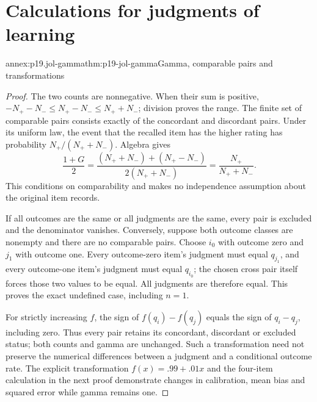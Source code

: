 \chapter{Calculations for judgments of learning}
\label{annex:p19-judgments-of-learning}

\begin{annexitem}{annex:p19.jol-gamma}{thm:p19-jol-gamma}{Gamma, comparable pairs and transformations}
\begin{proof}
The two counts are nonnegative. When their sum is positive,
\(-N_+-N_-\leq N_+-N_-\leq N_++N_-\); division proves
the range. The finite set of comparable pairs consists exactly
of the concordant and discordant pairs. Under its uniform law,
the event that the recalled item has the higher rating has
probability \(N_+/(N_++N_-)\). Algebra gives
\[
\frac{1+G}{2}
=\frac{(N_++N_-)+(N_+-N_-)}{2(N_++N_-)}
=\frac{N_+}{N_++N_-}.
\]
This conditions on comparability and makes no independence
assumption about the original item records.

If all outcomes are the same or all judgments are the same,
every pair is excluded and the denominator vanishes.
Conversely, suppose both outcome classes are nonempty and
there are no comparable pairs. Choose \(i_0\) with outcome
zero and \(j_1\) with outcome one. Every outcome-zero item's
judgment must equal \(q_{j_1}\), and every outcome-one item's
judgment must equal \(q_{i_0}\); the chosen cross pair itself
forces those two values to be equal. All judgments are therefore
equal. This proves the exact undefined case, including \(n=1\).

For strictly increasing \(f\), the sign of
\(f(q_i)-f(q_j)\) equals the sign of \(q_i-q_j\), including
zero. Thus every pair retains its concordant, discordant or
excluded status; both counts and gamma are unchanged.
Such a transformation need not preserve the numerical differences
between a judgment and a conditional outcome rate.
The explicit transformation \(f(x)=.99+.01x\) and the
four-item calculation in the next proof demonstrate changes
in calibration, mean bias and squared error while gamma
remains one.
\end{proof}
\end{annexitem}

